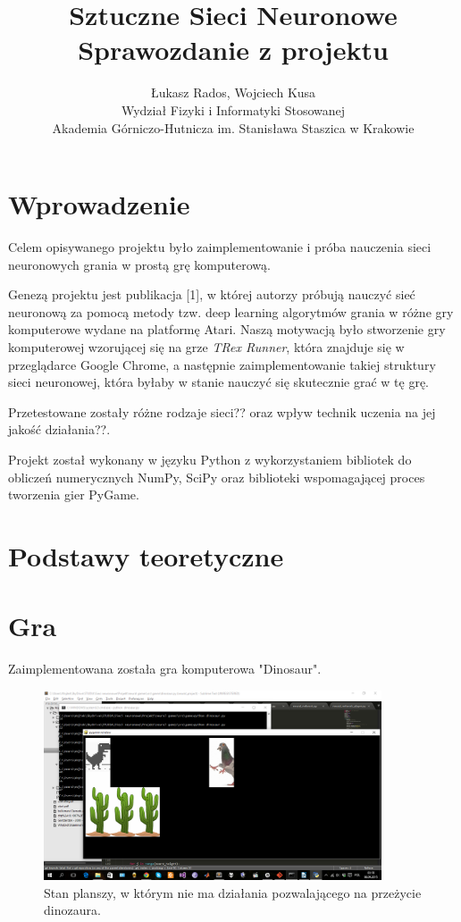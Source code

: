 \documentclass[11pt]{article} %
\title{Sztuczne Sieci Neuronowe \\ \large Sprawozdanie z projektu}
\author{Łukasz Rados, Wojciech Kusa \\ Wydział Fizyki i Informatyki Stosowanej \\ Akademia Górniczo-Hutnicza im. Stanisława Staszica w Krakowie}
\begin{document}
\maketitle

\section{Wprowadzenie}

Celem opisywanego projektu było zaimplementowanie i próba nauczenia sieci neuronowych grania w prostą grę komputerową. 

Genezą projektu jest publikacja [1], w której autorzy próbują nauczyć sieć neuronową za pomocą metody tzw. deep learning algorytmów grania w różne gry komputerowe wydane na platformę Atari. Naszą motywacją było stworzenie gry komputerowej wzorującej się na grze \textit{TRex Runner}, która znajduje się w przeglądarce Google Chrome, a następnie zaimplementowanie takiej struktury sieci neuronowej, która byłaby w stanie nauczyć się skutecznie grać w tę grę. 

Przetestowane zostały różne rodzaje sieci?? oraz wpływ technik uczenia na jej jakość działania??.

Projekt został wykonany w języku Python z wykorzystaniem bibliotek do obliczeń numerycznych NumPy, SciPy oraz biblioteki wspomagającej proces tworzenia gier PyGame.


\section{Podstawy teoretyczne}



\section{Gra}


Zaimplementowana została gra komputerowa "Dinosaur".

\begin{figure}[h]
\centering
\includegraphics[width=10cm]{images/dinosaur_1}
\caption{Stan planszy, w którym nie ma działania pozwalającego na przeżycie dinozaura.} \label{fig:dinosaur_1}
\end{figure}
\end{document}
